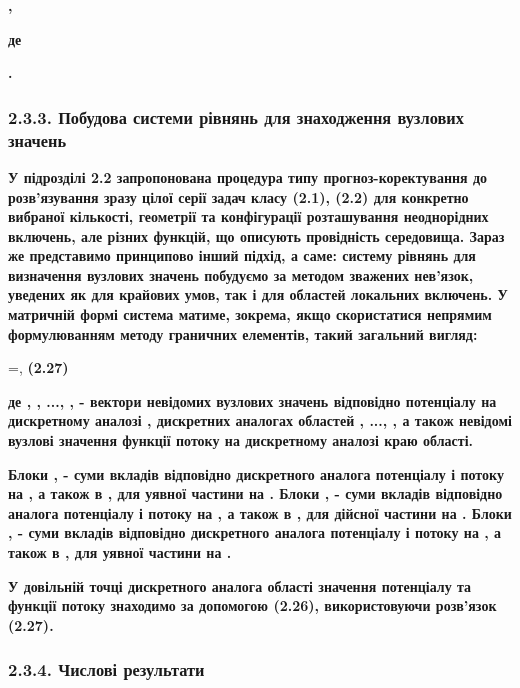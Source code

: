 \textbf{,}

\textbf{де}

\textbf{.}

\hypertarget{ux43fux43eux431ux443ux434ux43eux432ux430-ux441ux438ux441ux442ux435ux43cux438-ux440ux456ux432ux43dux44fux43dux44c-ux434ux43bux44f-ux437ux43dux430ux445ux43eux434ux436ux435ux43dux43dux44f-ux432ux443ux437ux43bux43eux432ux438ux445-ux437ux43dux430ux447ux435ux43dux44c}{%
\subsubsection{2.3.3. Побудова системи рівнянь для знаходження вузлових
значень}\label{ux43fux43eux431ux443ux434ux43eux432ux430-ux441ux438ux441ux442ux435ux43cux438-ux440ux456ux432ux43dux44fux43dux44c-ux434ux43bux44f-ux437ux43dux430ux445ux43eux434ux436ux435ux43dux43dux44f-ux432ux443ux437ux43bux43eux432ux438ux445-ux437ux43dux430ux447ux435ux43dux44c}}

\textbf{У підрозділі 2.2 запропонована процедура типу
прогноз-коректування до розв'язування зразу цілої серії задач класу
(2.1), (2.2) для конкретно вибраної кількості, геометрії та конфігурації
розташування неоднорідних включень, але різних функцій, що описують
провідність середовища. Зараз же представимо принципово інший підхід, а
саме: систему рівнянь для} \textbf{визначення вузлових значень побудуємо
за методом зважених нев'язок, уведених як для крайових умов, так і для
областей локальних включень. У матричній формі система матиме, зокрема,
якщо скористатися непрямим формулюванням методу граничних елементів,
такий загальний вигляд:}

=, \textbf{(2.27)}

\textbf{де , , ..., , - вектори невідомих вузлових значень відповідно
потенціалу на дискретному аналозі , дискретних аналогах областей , ...,
, а також невідомі вузлові значення функції потоку на дискретному
аналозі краю області.}

\textbf{Блоки , - суми вкладів відповідно дискретного аналога потенціалу
і потоку на , а також в , для уявної частини на . Блоки , - суми вкладів
відповідно аналога потенціалу і потоку на , а також в , для дійсної
частини на . Блоки , - суми вкладів відповідно дискретного аналога
потенціалу і потоку на , а також в , для уявної частини на .}

\textbf{У довільній точці дискретного аналога області значення
потенціалу та функції потоку знаходимо за допомогою (2.26),
використовуючи розв'язок (2.27).}

\hypertarget{ux447ux438ux441ux43bux43eux432ux456-ux440ux435ux437ux443ux43bux44cux442ux430ux442ux438-1}{%
\subsubsection{2.3.4. Числові
результати}\label{ux447ux438ux441ux43bux43eux432ux456-ux440ux435ux437ux443ux43bux44cux442ux430ux442ux438-1}}

